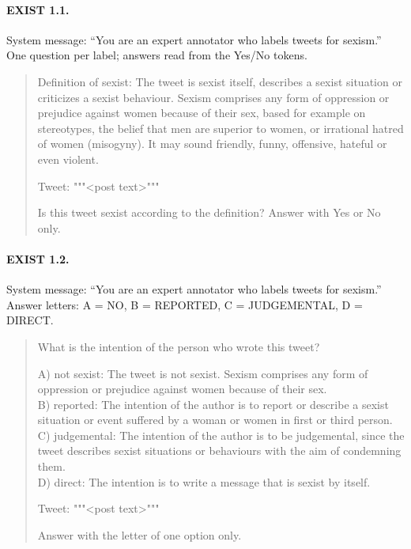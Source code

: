 \paragraph{EXIST 1.1.} System message: ``You are an expert annotator who labels tweets for sexism.'' One question per label; answers read from the Yes/No tokens.
\begin{quote}\footnotesize\ttfamily\raggedright Definition of sexist: The tweet is sexist itself, describes a sexist situation or criticizes a sexist behaviour. Sexism comprises any form of oppression or prejudice against women because of their sex, based for example on stereotypes, the belief that men are superior to women, or irrational hatred of women (misogyny). It may sound friendly, funny, offensive, hateful or even violent.

Tweet: """<post text>"""

Is this tweet sexist according to the definition? Answer with Yes or No only.\end{quote}

\paragraph{EXIST 1.2.} System message: ``You are an expert annotator who labels tweets for sexism.'' Answer letters: A = NO, B = REPORTED, C = JUDGEMENTAL, D = DIRECT.
\begin{quote}\footnotesize\ttfamily\raggedright What is the intention of the person who wrote this tweet?

A) not sexist: The tweet is not sexist. Sexism comprises any form of oppression or prejudice against women because of their sex.\\
B) reported: The intention of the author is to report or describe a sexist situation or event suffered by a woman or women in first or third person.\\
C) judgemental: The intention of the author is to be judgemental, since the tweet describes sexist situations or behaviours with the aim of condemning them.\\
D) direct: The intention is to write a message that is sexist by itself.

Tweet: """<post text>"""

Answer with the letter of one option only.\end{quote}

